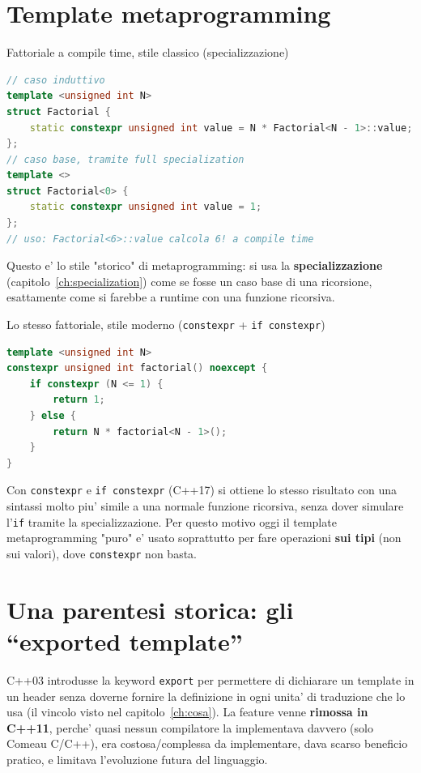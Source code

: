 \documentclass{report}
\newcommand{\code}[1]{\texttt{\small #1}}
\begin{document}
\section{Template metaprogramming}\label{ch:metaprogramming}


\begin{Example}{Fattoriale a compile time, stile classico (specializzazione)}{}
\begin{lstlisting}[language=C++]
// caso induttivo
template <unsigned int N>
struct Factorial {
    static constexpr unsigned int value = N * Factorial<N - 1>::value;
};
// caso base, tramite full specialization
template <>
struct Factorial<0> {
    static constexpr unsigned int value = 1;
};
// uso: Factorial<6>::value calcola 6! a compile time
\end{lstlisting}
Questo e' lo stile "storico" di metaprogramming: si usa la
\textbf{specializzazione} (capitolo~\ref{ch:specialization}) come se fosse un
caso base di una ricorsione, esattamente come si farebbe a runtime con una
funzione ricorsiva.
\end{Example}

\begin{Example}{Lo stesso fattoriale, stile moderno (\code{constexpr} + \code{if constexpr})}{}
\begin{lstlisting}[language=C++]
template <unsigned int N>
constexpr unsigned int factorial() noexcept {
    if constexpr (N <= 1) {
        return 1;
    } else {
        return N * factorial<N - 1>();
    }
}
\end{lstlisting}
Con \code{constexpr} e \code{if constexpr} (C++17) si ottiene lo stesso
risultato con una sintassi molto piu' simile a una normale funzione
ricorsiva, senza dover simulare l'\code{if} tramite la specializzazione.
Per questo motivo oggi il template metaprogramming "puro" e' usato
soprattutto per fare operazioni \textbf{sui tipi} (non sui valori), dove
\code{constexpr} non basta.
\end{Example}

\section{Una parentesi storica: gli ``exported template''}

C++03 introdusse la keyword \code{export} per permettere di dichiarare un
template in un header senza doverne fornire la definizione in ogni unita' di
traduzione che lo usa (il vincolo visto nel capitolo~\ref{ch:cosa}). La
feature venne \textbf{rimossa in C++11}, perche' quasi nessun compilatore la
implementava davvero (solo Comeau C/C++), era costosa/complessa da
implementare, dava scarso beneficio pratico, e limitava l'evoluzione futura
del linguaggio.
\end{document}
